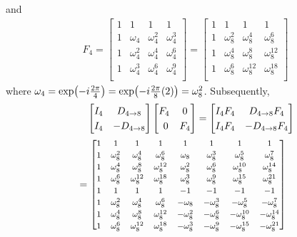 and 
\begin{align}
F_4 = 
\begin{bmatrix}
1 & 1 & 1 & 1 \\
1 & \omega_4 & \omega_4^2 & \omega_4^3 \\
1 & \omega_4^2 & \omega_4^4 & \omega_4^6 \\
1 & \omega_4^3 & \omega_4^6 & \omega_4^9 \\
\end{bmatrix}
=
\begin{bmatrix}
1 & 1 & 1 & 1 \\
1 & \omega_8^2 & \omega_8^4 & \omega_8^6 \\
1 & \omega_8^4 & \omega_8^8 & \omega_8^{12} \\
1 & \omega_8^6 & \omega_8^{12} & \omega_8^{18} \\
\end{bmatrix}
\end{align}
where $\omega_4 = \smash{\exp(-i\frac{2\pi}{4}) = \exp(-i\frac{2\pi}{8}(2))} = \omega_8^2$. Subsequently,
\begin{align}
&\quad \begin{bmatrix}
I_4 & D_{4 \to 8} \\
I_4 & -D_{4 \to 8}
\end{bmatrix}
\begin{bmatrix}
F_4 & 0 \\\
0 & F_4
\end{bmatrix} =
\begin{bmatrix}
I_4F_4 & D_{4 \to 8}F_4 \\
I_4F_4 & -D_{4 \to 8}F_4
\end{bmatrix} \nonumber \\
&=
\renewcommand\arraystretch{1.25}
\footnotesize
\begin{bmatrix}
1 & 1 & 1 & 1 & 1 & 1 & 1 & 1 \\
1 & \omega_8^2 & \omega_8^4 & \omega_8^6 & \omega_8 & \omega_8^3 & \omega_8^5 & \omega_8^7 \\
1 & \omega_8^4 & \omega_8^8 & \omega_8^{12} & \omega_8^2 & \omega_8^6 & \omega_8^{10} & \omega_8^{14} \\
1 & \omega_8^6 & \omega_8^{12} & \omega_8^{18} & \omega_8^3 & \omega_8^9 & \omega_8^{15} & \omega_8^{21} \\
1 & 1 & 1 & 1 & -1 & -1 & -1 & -1 \\
1 & \omega_8^2 & \omega_8^4 & \omega_8^6 & -\omega_8 & -\omega_8^3 & -\omega_8^5 & -\omega_8^7 \\
1 & \omega_8^4 & \omega_8^8 & \omega_8^{12} & -\omega_8^2 & -\omega_8^6 & -\omega_8^{10} & -\omega_8^{14} \\
1 & \omega_8^6 & \omega_8^{12} & \omega_8^{18} & -\omega_8^3 & -\omega_8^9 & -\omega_8^{15} & -\omega_8^{21} \\
\end{bmatrix}
\end{align}
